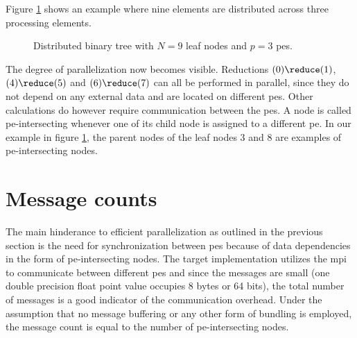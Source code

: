 Figure \ref{fig:distributed_binary_tree} shows an example where nine elements are distributed across three processing elements.
\begin{figure}[H]
\centering
{}
\caption{Distributed binary tree with $N=9$ leaf nodes and $p=3$ \glspl{pe}.}
\label{fig:distributed_binary_tree}
\end{figure}
The degree of parallelization now becomes visible. Reductions $(0) \reduce (1)$, $(4) \reduce (5)$ and $(6) \reduce (7)$ can all be performed in parallel, since
they do not depend on any external data and are located on different \glspl{pe}.
Other calculations do however require communication between the \glspl{pe}.
A node is called \gls{pe}-intersecting whenever one of its child node is assigned to a different \gls{pe}.
In our example in figure \ref{fig:distributed_binary_tree}, the parent nodes of the leaf nodes $3$ and $8$ are examples of \gls{pe}-intersecting nodes.

\section{Message counts}
The main hinderance to efficient parallelization as outlined in the previous section is the need for synchronization between \glspl{pe} because of data dependencies in the form of \gls{pe}-intersecting nodes.
The target implementation utilizes the \gls{mpi} to communicate between different \glspl{pe} and since the messages are small (one double precision float point value occupies 8 bytes or 64 bits), the total number of messages is a good indicator of the communication overhead.
Under the assumption that no message buffering or any other form of bundling is employed, the message count is equal to the number of \gls{pe}-intersecting nodes.

